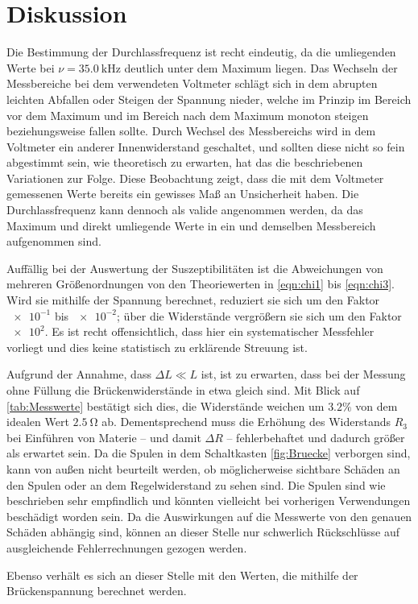 \section{Diskussion}
\label{sec:Diskussion}

Die Bestimmung der Durchlassfrequenz ist recht eindeutig, da die umliegenden Werte bei $\nu=\SI{35.0}{\kilo\hertz}$ 
deutlich unter dem Maximum liegen. 
Das Wechseln der Messbereiche bei dem verwendeten Voltmeter schlägt sich in dem abrupten leichten Abfallen oder Steigen 
der Spannung nieder, welche im Prinzip im Bereich vor dem Maximum und im Bereich nach dem Maximum monoton steigen beziehungsweise 
fallen sollte. 
Durch Wechsel des Messbereichs wird in dem Voltmeter ein anderer Innenwiderstand geschaltet, und sollten diese nicht 
so fein abgestimmt sein, wie theoretisch zu erwarten, hat das die beschriebenen Variationen zur Folge. 
Diese Beobachtung zeigt, dass die mit dem Voltmeter gemessenen Werte bereits ein gewisses Maß an Unsicherheit haben. 
Die Durchlassfrequenz kann dennoch als valide angenommen werden, da das Maximum und direkt umliegende Werte 
in ein und demselben Messbereich aufgenommen sind. 

Auffällig bei der Auswertung der Suszeptibilitäten ist die Abweichungen von mehreren Größenordnungen von den Theoriewerten in \eqref{eqn:chi1} bis \eqref{eqn:chi3}. 
Wird sie mithilfe der Spannung berechnet, reduziert sie sich um den Faktor $\num{e-1}$ bis $\num{e-2}$; 
über die Widerstände vergrößern sie sich um den Faktor $\num{e2}$. 
Es ist recht offensichtlich, dass hier ein systematischer Messfehler vorliegt und dies keine statistisch zu erklärende Streuung ist.

Aufgrund der Annahme, dass $\Delta L\ll L$ ist, ist zu erwarten, dass bei der Messung ohne Füllung die Brückenwiderstände 
in etwa gleich sind. Mit Blick auf \ref{tab:Messwerte} bestätigt sich dies, die Widerstände weichen um $3.2\%$ von dem 
idealen Wert $\SI{2.5}{\ohm}$ ab. 
Dementsprechend muss die Erhöhung des Widerstands $R_3$ bei Einführen von Materie -- und damit $\Delta R$ -- fehlerbehaftet und dadurch größer als erwartet sein. 
Da die Spulen in dem Schaltkasten \ref{fig:Bruecke} verborgen sind, kann von außen nicht beurteilt werden, ob möglicherweise 
sichtbare Schäden an den Spulen oder an dem Regelwiderstand zu sehen sind. 
Die Spulen sind wie beschrieben sehr empfindlich und könnten vielleicht bei vorherigen Verwendungen beschädigt worden sein. 
Da die Auswirkungen auf die Messwerte von den genauen Schäden abhängig sind, können an dieser Stelle nur schwerlich Rückschlüsse 
auf ausgleichende Fehlerrechnungen gezogen werden. 

Ebenso verhält es sich an dieser Stelle mit den Werten, die mithilfe der Brückenspannung berechnet werden. 
